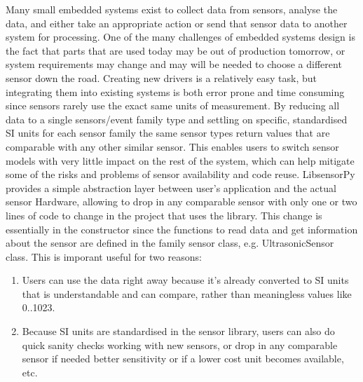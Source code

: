 \documentclass{acm_proc_article-sp}
\begin{document}
Many small embedded systems exist to collect data from sensors, analyse the data, and either take an appropriate action or send that sensor data to another system for processing. One of the many challenges of embedded systems design is the fact that parts that are used today may be out of production tomorrow, or system requirements may change and may will be needed to choose a different sensor down the road.
\newline
\newline
Creating new drivers is a relatively easy task, but integrating them into existing systems is both error prone and time consuming since sensors rarely use the exact same units of measurement. By reducing all data to a single sensors/event family type and settling on specific, standardised SI units for each sensor family the same sensor types return values that are comparable with any other similar sensor. This enables users to switch sensor models with very little impact on the rest of the system, which can help mitigate some of the risks and problems of sensor availability and code reuse.
\newline
\newline
LibsensorPy provides a simple abstraction layer between user's application and the actual sensor Hardware, allowing to drop in any comparable sensor with only one or two lines of code to change in the project that uses the library. This change is essentially in the constructor since the functions to read data and get information about the sensor are defined in the family sensor class, e.g. UltrasonicSensor class.
\newline
\newline
This is imporant useful for two reasons:

\begin{enumerate}
\item Users can use the data right away because it's already converted to SI units that is understandable and can compare, rather than meaningless values like 0..1023.
\item Because SI units are standardised in the sensor library, users can also do quick sanity checks working with new sensors, or drop in any comparable sensor if needed better sensitivity or if a lower cost unit becomes available, etc.
\end{enumerate}
\end{document}
